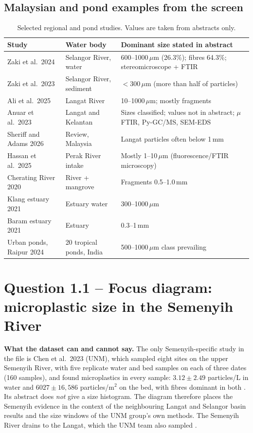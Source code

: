 \documentclass[11pt,a4paper]{article}
\newcommand{\um}{\,\ensuremath{\mu}m}
\newcommand{\flag}[1]{\textcolor{accent}{\textbf{#1}}}
\begin{document}
\subsection{Malaysian and pond examples from the screen}
\begin{table}[H]\centering\small
\begin{tabularx}{\textwidth}{@{}p{3.6cm}p{3.8cm}X@{}}
\toprule Study & Water body & Dominant size stated in abstract \\\midrule
Zaki et al.\ 2024 \cite{zaki24} & Selangor River, water & 600--1000\um{} (26.3\%); fibres 64.3\%; stereomicroscope + FTIR \\
Zaki et al.\ 2023 \cite{zaki23} & Selangor River, sediment & $<$300\um{} (more than half of particles) \\
Ali et al.\ 2025 \cite{ali25} & Langat River & 10--1000\um{}; mostly fragments \\
Anuar et al.\ 2023 \cite{anuar23} & Langat and Kelantan & Sizes classified; values not in abstract; $\mu$FTIR, Py-GC/MS, SEM-EDS \\
Sheriff and Adams 2026 \cite{sheriff26} & Review, Malaysia & Langat particles often below 1\,mm \\
Hassan et al.\ 2025 \cite{hassan25} & Perak River intake & Mostly 1--10\um{} (fluorescence/FTIR microscopy) \\
Cherating River 2020 \cite{cherating20} & River + mangrove & Fragments 0.5--1.0\,mm \\
Klang estuary 2021 \cite{klang21} & Estuary water & 300--1000\um{} \\
Baram estuary 2021 \cite{baram21} & Estuary & 0.3--1\,mm \\
Urban ponds, Raipur 2024 \cite{raipur24} & 20 tropical ponds, India & 500--1000\um{} class prevailing \\
\bottomrule\end{tabularx}
\caption{Selected regional and pond studies. Values are taken from abstracts only.}
\end{table}

\section{Question 1.1 -- Focus diagram: microplastic size in the Semenyih River}
\flag{What the dataset can and cannot say.} The only Semenyih-specific study in the file is Chen et al.\ 2023 (UNM), which sampled eight sites on the upper Semenyih River, with five replicate water and bed samples on each of three dates (160 samples), and found microplastics in every sample: $3.12\pm2.49$ particles/L in water and $6027\pm16{,}586$ particles/m$^{2}$ on the bed, with fibres dominant in both \cite{chen23}. Its abstract does \emph{not} give a size histogram. The diagram therefore places the Semenyih evidence in the context of the neighbouring Langat and Selangor basin results and the size windows of the UNM group's own methods. The Semenyih River drains to the Langat, which the UNM team also sampled \cite{chen21a}.
\end{document}
